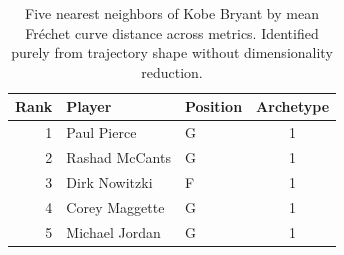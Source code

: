 \begin{table}[htbp]
  \centering\small
  \begin{tabular}{rllc}
    \toprule
    Rank & Player & Position & Archetype \\
    \midrule
    1 & Paul Pierce & G & 1 \\
    2 & Rashad McCants & G & 1 \\
    3 & Dirk Nowitzki & F & 1 \\
    4 & Corey Maggette & G & 1 \\
    5 & Michael Jordan & G & 1 \\
    \bottomrule
  \end{tabular}
  \caption{Five nearest neighbors of Kobe Bryant by mean Fr\'{e}chet curve distance across metrics. Identified purely from trajectory shape without dimensionality reduction.}
  \label{tab:Kobe_Bryant_frechet_curve_neighbors}
\end{table}

